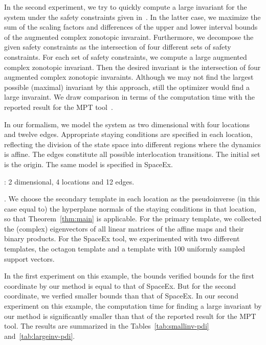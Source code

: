 In the second experiment, we try to quickly compute a large invariant
for the system under the safety constraints given
in~\cite{rakovic2004computation}.  %
In the latter case, we maximize the sum of the scaling factors and
differences of the upper and lower interval bounds of the augmented
complex zonotopic invaraint.  Furthermore, we decompose the given
safety constraints as the intersection of four different sets of
safety constraints.  For each set of safety constraints, we compute a
large augmented complex zonotopic invariant.  Then the desired
invariant is the intersection of four augmented complex zonotopic
invaraints.  Although we may not find the largest possible (maximal)
invariant by this approach, still the optimizer would find a large
invaraint.  We draw comparison in terms of the computation time with
the reported result for the MPT tool~\cite{rakovic2004computation}.

  In our formalism, we model the system as two
dimensional with four locations and twelve edges.  Appropriate staying
conditions are specified in each location, reflecting the division of
the state space into different regions where the dynamics is affine.
The edges constitute all possible interlocation transitions.  The
initial set is the origin.  The same model is specified in SpaceEx.

: 2 dimensional, 4 locations and 12 edges.

.  We choose the secondary template in each
location as the pseudoinverse (in this case equal to) the hyperplane
normals of the staying conditions in that location, so that
Theorem~\ref{thm:main} is applicable.  For the primary template, we
collected the (complex) eigenvectors of all linear matrices of the
affine maps and their binary products. For the SpaceEx tool, we
experimented with two different templates, the octagon template and a
template with 100 uniformly sampled support vectors.

  In the first experiment on this example, the bounds
verified bounds for the first coordinate by our method is equal to
that of SpaceEx. But for the second coordinate, we verfied smaller
bounds than that of SpaceEx.  In our second experiment on this
example, the computation time for finding a large invariant by our
method is significantly smaller than that of the reported result for
the MPT tool.  The results are summarized in the Tables~\ref{tab:smallinv-pdi}
and~\ref{tab:largeinv-pdi}.

